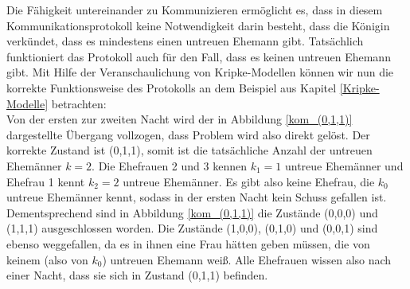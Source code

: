 Die Fähigkeit untereinander zu Kommunizieren ermöglicht es, dass in diesem Kommunikationsprotokoll keine Notwendigkeit darin besteht, dass die Königin verkündet, dass es mindestens einen untreuen Ehemann gibt. Tatsächlich funktioniert das Protokoll auch für den Fall, dass es keinen untreuen Ehemann gibt.
Mit Hilfe der Veranschaulichung von Kripke-Modellen können wir nun die korrekte Funktionsweise des Protokolls an dem Beispiel aus Kapitel \ref{Kripke-Modelle} betrachten:\\
Von der ersten zur zweiten Nacht wird der in Abbildung \ref{kom_(0,1,1)} dargestellte Übergang vollzogen, dass Problem wird also direkt gelöst.
Der korrekte Zustand ist (0,1,1), somit ist die tatsächliche Anzahl der untreuen Ehemänner $k=2$. Die Ehefrauen 2 und 3 kennen $k_1 = 1$ untreue Ehemänner und Ehefrau 1 kennt $k_2 = 2$ untreue Ehemänner. Es gibt also keine Ehefrau, die $k_0$ untreue Ehemänner kennt, sodass in der ersten Nacht kein Schuss gefallen ist. Dementsprechend sind in Abbildung \ref{kom_(0,1,1)} die Zustände (0,0,0) und (1,1,1) ausgeschlossen worden.
Die Zustände (1,0,0), (0,1,0) und (0,0,1) sind ebenso weggefallen, da es in ihnen eine Frau hätten geben müssen, die von keinem (also von $k_0$) untreuen Ehemann weiß. Alle Ehefrauen wissen also nach einer Nacht, dass sie sich in Zustand (0,1,1) befinden.

